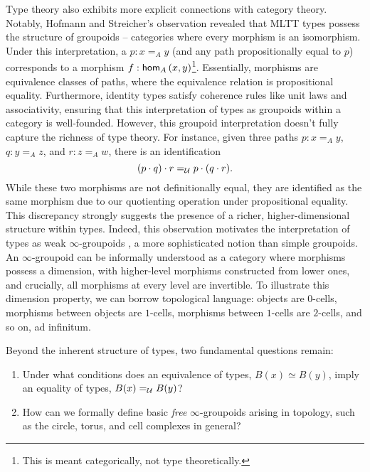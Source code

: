 \documentclass[main.tex]{subfiles}
\begin{document}
Type theory also exhibits more explicit connections with category theory. Notably, Hofmann and Streicher's observation \cite{hofmann1998groupoid} revealed that MLTT types possess the structure of groupoids – categories where every morphism is an isomorphism. Under this interpretation, a $p : x=_A y$ (and any path propositionally equal to $p$) corresponds to a morphism $f : \ho[A]{x}{y}$\footnote{This is meant categorically, not type theoretically.}. Essentially, morphisms are equivalence classes of paths, where the equivalence relation is propositional equality. Furthermore, identity types satisfy coherence rules like unit laws and associativity, ensuring that this interpretation of types as groupoids within a category is well-founded. However, this groupoid interpretation doesn't fully capture the richness of type theory. For instance, given three paths $p : x =_A y$, $q : y=_A z$, and $r : z =_A w$, there is an identification
 \[
 (p \cdot q) \cdot r =_\U p \cdot (q \cdot r).
 \]
While these two morphisms are not definitionally equal, they are identified as the same morphism due to our quotienting operation under propositional equality. This discrepancy strongly suggests the presence of a richer, higher-dimensional structure within types. Indeed, this observation motivates the interpretation of types as weak $\infty$-groupoids \cite{berg_garner_richard}, a more sophisticated notion than simple groupoids. An $\infty$-groupoid can be informally understood as a category where morphisms possess a dimension, with higher-level morphisms constructed from lower ones, and crucially, all morphisms at every level are invertible. To illustrate this dimension property, we can borrow topological language: objects are $0$-cells, morphisms between objects are $1$-cells, morphisms between $1$-cells are $2$-cells, and so on, ad infinitum.

Beyond the inherent structure of types, two fundamental questions remain:
\begin{enumerate}
  \item Under what conditions does an equivalence of types, $B(x) \simeq B(y)$, imply an equality of types, $B(x)=_{\U} B(y)$?
  \item How can we formally define basic \textit{free} $\infty$-groupoids arising in topology, such as the circle, torus, and cell complexes in general?
\end{enumerate}
\end{document}

